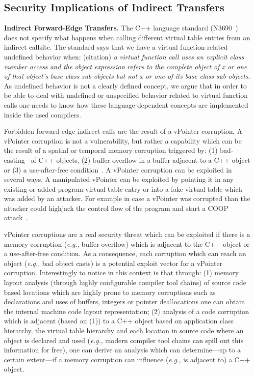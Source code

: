 \subsection{Security Implications of Indirect Transfers}
\label{Security Implications of Forbidden Forward Indirect Calls}
\textbf{Indirect Forward-Edge Transfers.} The C++ language standard (N3690~\cite{iso:iecN3690}) does not specify what happens when calling different virtual table entries from an indirect callsite. 
The standard says that we have a virtual function-related undefined behavior when: (citation) \textit{a virtual function call uses an explicit class member access and 
the object expression refers to the complete object of x or one of that object's base class sub-objects but not x or one of its base class sub-objects}. As 
undefined behavior is not a clearly defined concept, we argue that in order to be able to deal with undefined or unspecified behavior related to 
virtual function calls one needs to know how these language-dependent concepts are implemented inside the used compilers.

Forbidden forward-edge indirect calls are the result of a vPointer corruption. A vPointer corruption is not a vulnerability, but rather a capability which
can be the result of a spatial or temporal memory corruption triggered by: 
(1) bad-casting~\cite{byoungyoung:typecasting} of C++ objects, 
(2) buffer overflow in a buffer adjacent to a C++ object or 
(3) a use-after-free condition~\cite{schuster:coop}.
A vPointer corruption can be exploited in several ways. A manipulated vPointer can be exploited by pointing it in any existing or added program virtual 
table entry or into a fake virtual table which was added by an attacker. For example in case a vPointer
was corrupted than the attacker could highjack the control flow of the program and start a COOP attack~\cite{schuster:coop}.

vPointer corruptions are a real security threat which can be exploited if there is a memory corruption (\textit{e.g.,} buffer overflow) which is adjacent 
to the C++ object or a use-after-free condition. As a consequence, each corruption which can reach an object (\textit{e.g.,} bad object casts) is a potential
exploit vector for a vPointer corruption. Interestingly to notice in this context is that through:
(1) memory layout analysis (through highly configurable compiler tool chains) of source code based locations which are highly prone to memory corruptions such 
as declarations and uses of buffers, integers or pointer deallocations one can obtain the internal machine code layout representation;
(2) analysis of a code corruption which is adjacent (based on (1)) to a C++ object based on application class hierarchy, the virtual table hierarchy and each
location in source code where an object is declared and used (\textit{e.g.,} modern compiler tool chains can spill out this information for free), one can 
derive an analysis which can determine---up to a certain extent---if a memory corruption can influence (\textit{e.g.,} is adjacent to) a C++ object.

